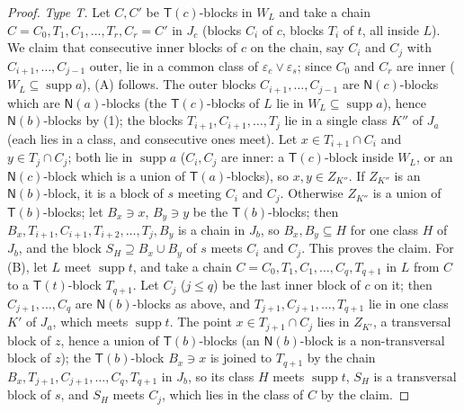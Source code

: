\documentclass[11pt]{amsart}
\theoremstyle{definition}
\newcommand{\supp}{\operatorname{supp}}
\newcommand{\T}{\mathsf{T}}
\newcommand{\N}{\mathsf{N}}
\begin{document}
\begin{proof}
\emph{Type T.} Let $C,C'$ be $\T(c)$-blocks in $W_L$ and take a chain $C=C_0,T_1,C_1,\dots,T_r,C_r=C'$ in $J_c$ (blocks $C_i$ of $c$, blocks $T_i$ of $t$, all inside $L$). We claim that consecutive inner blocks of $c$ on the chain, say $C_i$ and $C_j$ with $C_{i+1},\dots,C_{j-1}$ outer, lie in a common class of $\varepsilon_c\vee\varepsilon_s$; since $C_0$ and $C_r$ are inner ($W_L\subseteq\supp a$), (A) follows. The outer blocks $C_{i+1},\dots,C_{j-1}$ are $\N(c)$-blocks which are $\N(a)$-blocks (the $\T(c)$-blocks of $L$ lie in $W_L\subseteq\supp a$), hence $\N(b)$-blocks by (1); the blocks $T_{i+1},C_{i+1},\dots,T_j$ lie in a single class $K''$ of $J_a$ (each lies in a class, and consecutive ones meet). Let $x\in T_{i+1}\cap C_i$ and $y\in T_j\cap C_j$; both lie in $\supp a$ ($C_i,C_j$ are inner: a $\T(c)$-block inside $W_L$, or an $\N(c)$-block which is a union of $\T(a)$-blocks), so $x,y\in Z_{K''}$. If $Z_{K''}$ is an $\N(b)$-block, it is a block of $s$ meeting $C_i$ and $C_j$. Otherwise $Z_{K''}$ is a union of $\T(b)$-blocks; let $B_x\ni x$, $B_y\ni y$ be the $\T(b)$-blocks; then $B_x,T_{i+1},C_{i+1},T_{i+2},\dots,T_j,B_y$ is a chain in $J_b$, so $B_x,B_y\subseteq H$ for one class $H$ of $J_b$, and the block $S_H\supseteq B_x\cup B_y$ of $s$ meets $C_i$ and $C_j$. This proves the claim. For (B), let $L$ meet $\supp t$, and take a chain $C=C_0,T_1,C_1,\dots,C_q,T_{q+1}$ in $L$ from $C$ to a $\T(t)$-block $T_{q+1}$. Let $C_j$ ($j\le q$) be the last inner block of $c$ on it; then $C_{j+1},\dots,C_q$ are $\N(b)$-blocks as above, and $T_{j+1},C_{j+1},\dots,T_{q+1}$ lie in one class $K'$ of $J_a$, which meets $\supp t$. The point $x\in T_{j+1}\cap C_j$ lies in $Z_{K'}$, a transversal block of $z$, hence a union of $\T(b)$-blocks (an $\N(b)$-block is a non-transversal block of $z$); the $\T(b)$-block $B_x\ni x$ is joined to $T_{q+1}$ by the chain $B_x,T_{j+1},C_{j+1},\dots,C_q,T_{q+1}$ in $J_b$, so its class $H$ meets $\supp t$, $S_H$ is a transversal block of $s$, and $S_H$ meets $C_j$, which lies in the class of $C$ by the claim.


\end{proof}
\end{document}
